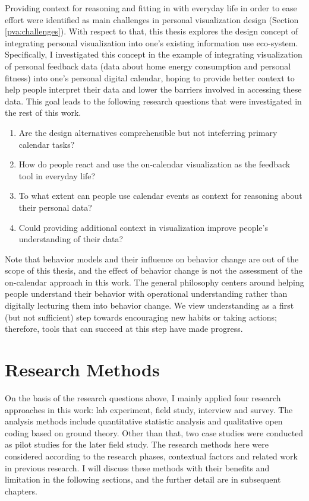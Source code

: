 \documentclass[12pt,oneside]{book}
\begin{document}
\label{chap:research methods}
Providing context for reasoning and fitting in with everyday life in order to ease effort were identified as main challenges in personal visualization design (Section \ref{pva:challenges}). With respect to that, this thesis explores the design concept of integrating personal visualization into one's existing information use eco-system.  Specifically, I investigated this concept in the example of integrating visualization of personal feedback data (data about home energy consumption and personal fitness) into one's personal digital calendar, hoping to provide better context to help people interpret their data and lower the barriers involved in accessing these data.  This goal leads to the following research questions that were investigated in the rest of this work.
\begin{enumerate}
	\item{Are the design alternatives comprehensible but not inteferring primary calendar tasks?}
	\item{How do people react and use the on-calendar visualization as the feedback tool in everyday life?}
	\item{To what extent can people use calendar events as context for reasoning about their personal data?}
	\item{Could providing additional context in visualization improve people's understanding of their data?}	
\end{enumerate}

Note that behavior models and their influence on behavior change are out of the scope of this thesis, and the effect of behavior change is not the assessment of the on-calendar approach in this work.  The general philosophy centers around helping people understand their behavior with operational understanding \cite{bartram_design_2015, strengers_designing_2011} rather than digitally lecturing them into behavior change.  We view understanding as a first (but not sufficient) step towards encouraging new habits or taking actions; therefore, tools that can succeed at this step have made progress.

\section{Research Methods}
On the basis of the research questions above, I mainly applied four research approaches in this work: lab experiment, field study, interview and survey. The analysis methods include quantitative statistic analysis and qualitative open coding based on ground theory.  Other than that, two case studies were conducted as pilot studies for the later field study.  The research methods here were considered according to the research phases, contextual factors and related work in previous research.  I will discuss these methods with their benefits and limitation in the following sections, and the further detail are in subsequent chapters.
\end{document}
